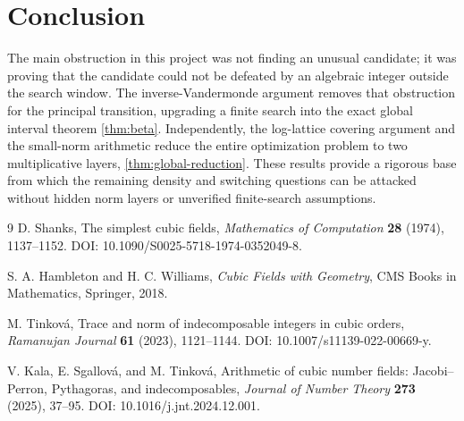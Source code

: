 \documentclass[11pt]{article}
\theoremstyle{definition}
\begin{document}
\section{Conclusion}
The main obstruction in this project was not finding an unusual candidate; it was proving that the candidate could not be defeated by an algebraic integer outside the search window.  The inverse-Vandermonde argument removes that obstruction for the principal transition, upgrading a finite search into the exact global interval theorem \cref{thm:beta}.  Independently, the log-lattice covering argument and the small-norm arithmetic reduce the entire optimization problem to two multiplicative layers, \cref{thm:global-reduction}.  These results provide a rigorous base from which the remaining density and switching questions can be attacked without hidden norm layers or unverified finite-search assumptions.

\small
\begin{thebibliography}{9}
D. Shanks,
\newblock The simplest cubic fields,
\newblock \emph{Mathematics of Computation} \textbf{28} (1974), 1137--1152.
\newblock DOI: 10.1090/S0025-5718-1974-0352049-8.

S. A. Hambleton and H. C. Williams,
\newblock \emph{Cubic Fields with Geometry},
\newblock CMS Books in Mathematics, Springer, 2018.

M. Tinkov\'a,
\newblock Trace and norm of indecomposable integers in cubic orders,
\newblock \emph{Ramanujan Journal} \textbf{61} (2023), 1121--1144.
\newblock DOI: 10.1007/s11139-022-00669-y.

V. Kala, E. Sgallov\'a, and M. Tinkov\'a,
\newblock Arithmetic of cubic number fields: Jacobi--Perron, Pythagoras, and indecomposables,
\newblock \emph{Journal of Number Theory} \textbf{273} (2025), 37--95.
\newblock DOI: 10.1016/j.jnt.2024.12.001.
\end{thebibliography}
\end{document}
